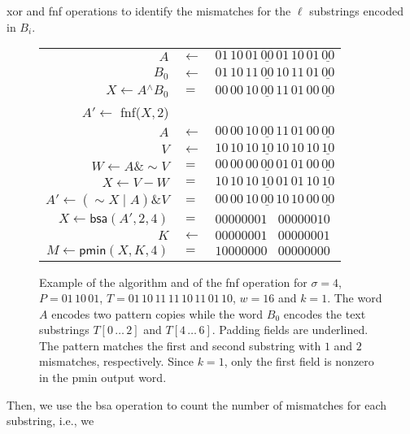 \documentclass{llncs}
\def \bxor{\textsf{xor}\xspace}
\newcommand{\uxor}{\mathrel{^\wedge}}
\newcommand{\uand}{\mathrel{\&}}
\newcommand{\uor}{\mathrel{|}}
\newcommand{\unot}{\mathop{\sim}}
\newcommand{\word}[1]{#1}
\begin{document}
\bxor and \textsf{fnf} operations to identify the mismatches for the
$\ell$ substrings encoded in $B_i$.
\begin{figure}[!t]
\begin{center}
\begin{scriptsize}
\renewcommand{\tabcolsep}{0.09cm}
\begin{tabular}{|rll|}
\hline
$A$ & $\leftarrow$ & $01\,10\,01\,\underline{00}\,01\,10\,01\,\underline{00}$ \\
$B_0$ & $\leftarrow$ & $01\,10\,11\,\underline{00}\,10\,11\,01\,\underline{00}$ \\
$X\leftarrow A\uxor B_0$ & $=$ & $00\,00\,10\,\underline{00}\,11\,01\,00\,\underline{00}$ \\
\hline
$A'\leftarrow$ \textsf{fnf}($X, 2$) & & \\
\hline
$A$ & $\leftarrow$ & $00\,00\,10\,\underline{00}\,11\,01\,00\,\underline{00}$ \\
$V$ & $\leftarrow$ & $10\,10\,10\,\underline{10}\,10\,10\,10\,\underline{10}$ \\
$W\leftarrow A \uand \unot V$  & $=$ & $00\,00\,00\,\underline{00}\,01\,01\,00\,\underline{00}$ \\
$X\leftarrow V - W$ & $=$ & $10\,10\,10\,\underline{10}\,01\,01\,10\,\underline{10}$ \\
$A'\leftarrow (\unot X \uor A) \uand V$ & $=$ & $00\,00\,10\,\underline{00}\,10\,10\,00\,\underline{00}$ \\
\hline
$X\leftarrow \textsf{bsa}(\word{A'}, 2, 4)$ & $=$ & $00000001\,\,\,\,\,00000010$ \\
$K$ & $\leftarrow$ & $00000001\,\,\,\,\,00000001$ \\
$M\leftarrow \textsf{pmin}(X, K, 4)$ & $=$ & $10000000\,\,\,\,\,00000000$ \\
\hline
\end{tabular}
\end{scriptsize}
\end{center}
\caption{Example of the algorithm and of the \textsf{fnf} operation for $\sigma=4$, $P=01\,10\,01$, $T=01\,10\,11\,11\,10\,11\,01\,10$, $w=16$ and $k=1$. The word $A$ encodes two pattern copies while the word $B_0$ encodes the text substrings $T[0\,\ldots\,2]$ and $T[4\,\ldots\,6]$. Padding fields are underlined. The pattern matches the first and second substring with $1$ and $2$ mismatches, respectively. Since $k=1$, only the first field is nonzero in the \textsf{pmin} output word.}
\label{fig:example}
\end{figure}
Then, we use the \textsf{bsa} operation to count the number of mismatches for each substring, i.e., we
\end{document}
